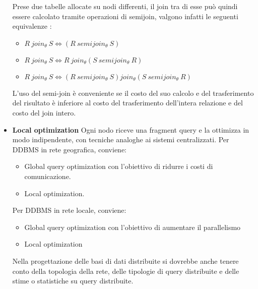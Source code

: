 \begin{itemize}
    Prese due tabelle allocate su nodi differenti, il join tra di esse può quindi essere calcolato tramite operazioni di semijoin, valgono infatti le seguenti equivalenze : 
    \begin{itemize} 
        \item $R \ join_{\theta} \ S \iff (R \ semijoin_{\theta} \ S)$ 
        \item $R \ join_{\theta} \ S \iff R \ join_\theta(S \ semijoin_{\theta} \ R)$ 
        \item $R \ join_{\theta} \ S \iff (R \ semijoin_{\theta} \ S) join_\theta(S \ semijoin_{\theta} \ R)$ 
    \end{itemize}
    L’uso del semi-join è conveniente se il costo del suo calcolo e del trasferimento del risultato è inferiore al costo del trasferimento dell’intera relazione e del costo del join intero.
    \item \textbf{Local optimization}
    Ogni nodo riceve una fragment query e la ottimizza in modo indipendente, con tecniche analoghe ai sistemi centralizzati. Per DDBMS in rete geografica, conviene:
    \begin{itemize}
        \item Global query optimization con l’obiettivo di ridurre i costi di comunicazione.
        \item Local optimization.
    \end{itemize}
    Per DDBMS in rete locale, conviene:
    \begin{itemize}
        \item Global query optimization con l’obiettivo di aumentare il parallelismo
        \item Local optimization
    \end{itemize}
    Nella progettazione delle basi di dati distribuite si dovrebbe anche tenere conto della topologia della rete, delle tipologie di query distribuite e delle stime o statistiche su query distribuite.
\end{itemize}
